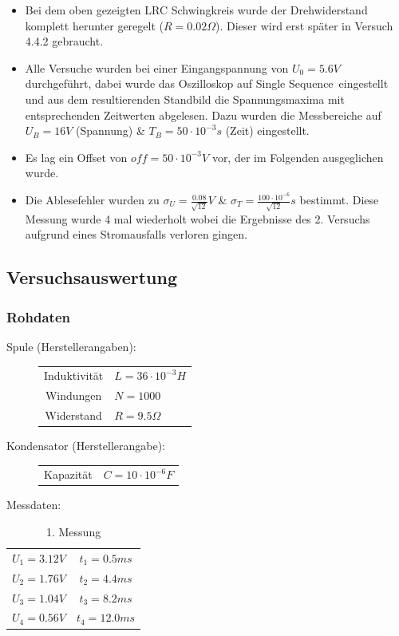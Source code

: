 \documentclass[12pt,a4paper]{article}
\begin{document}
\begin{itemize}
\item Bei dem oben gezeigten LRC Schwingkreis wurde der Drehwiderstand komplett herunter geregelt ($R=0.02\Omega$). Dieser wird erst später in Versuch 4.4.2 gebraucht.
 
\item Alle Versuche wurden bei einer Eingangspannung von $U_0=5.6V$ durchgeführt, dabei wurde das Oszilloskop auf \glqq Single Sequence\grqq $\,$ eingestellt und aus dem resultierenden Standbild die Spannungsmaxima mit entsprechenden Zeitwerten abgelesen. Dazu wurden die Messbereiche auf $U_B=16V$ (Spannung) \& $T_B=50 \cdot 10^{-3}s$ (Zeit) eingestellt.
\item Es lag ein Offset von $off=50 \cdot 10^{-3}V$ vor, der im Folgenden ausgeglichen wurde.
\item Die Ablesefehler wurden zu $\sigma_U=\frac{0.08}{\sqrt{12}}V$ \& $\sigma_T=\frac{100\cdot 10^{-6}}{\sqrt{12}}s$ bestimmt.
Diese Messung wurde 4 mal wiederholt wobei die Ergebnisse des 2. Versuchs aufgrund eines Stromausfalls verloren gingen.
\end{itemize}

\newpage
\subsection{Versuchsauswertung}

\subsubsection{Rohdaten}

Spule (Herstellerangaben): 
\begin{figure}[H]\centering
\begin{tabular}{c|l}
Induktivität & $L=36\cdot 10^{-3}H$\\ 
Windungen & $N=1000$\\ 
Widerstand & $R=9.5\Omega$ \\
\end{tabular} 
\end{figure}

Kondensator (Herstellerangabe):
\begin{figure}[H]\centering
\begin{tabular}{c|l}
Kapazität & $C=10 \cdot 10^{-6}F$\\ 
\end{tabular} 
\end{figure}

Messdaten:
\begin{table}[H]\centering
\caption{1. Messung}
\begin{tabular}{c|c}
\hline
$U_1=3.12V$& $t_1=0.5ms$\\ 
$U_2=1.76V$& $t_2=4.4ms$\\ 
$U_3=1.04V$& $t_3=8.2ms$ \\
$U_4=0.56V$& $t_4=12.0ms$ \\
\end{tabular} 
\end{table}
\end{document}
